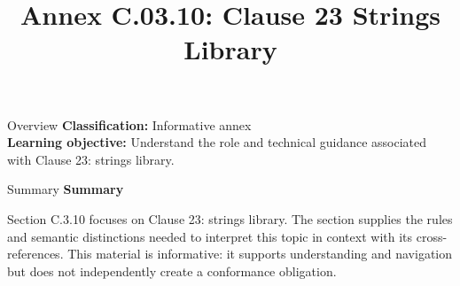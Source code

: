 \documentclass[10pt,letterpaper]{article}
\title{Annex C.03.10: Clause 23 Strings Library}
\author{}
\date{}
\begin{document}
\maketitle
\begin{CornellOverviewBox}{Overview}
\textbf{Classification:} Informative annex\\[2pt]
\textbf{Learning objective:} Understand the role and technical guidance associated with Clause 23: strings library.
\end{CornellOverviewBox}\begin{CornellSummaryBox}{Summary}
{\sffamily\bfseries\color{Accent} Summary}\par\vspace{3pt}Section C.3.10 focuses on Clause 23: strings library. The section supplies the rules and semantic distinctions needed to interpret this topic in context with its cross-references. This material is informative: it supports understanding and navigation but does not independently create a conformance obligation.
\end{CornellSummaryBox}
\end{document}
